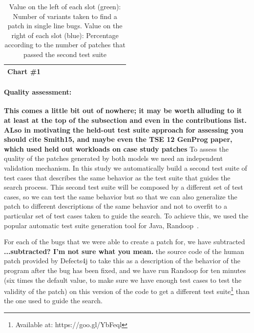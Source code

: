 \documentclass[conference]{IEEEtran}
\newcommand{\ra}[1]{\renewcommand{\arraystretch}{#1}}
\newcommand{\todo}[1]
  {{\scriptsize \textbf{\color{red} {#1}}}}
\begin{document}
\begin{table}
{\begin{tabular}{|r|rr|rr|rr|rr|rr|rr|}
 Chart \#1 & \color{OliveGreen}{1.8}&\color{blue}{0\%} & \color{OliveGreen}{7.3}&\color{blue}{0\%} & \color{OliveGreen}{4.9}&\color{blue}{0\%} & \color{OliveGreen}{19.0}&\color{blue}{0\%} & \color{OliveGreen}{2.2}&\color{blue}{0\%} & \color{OliveGreen}{4.8}&\color{blue}{0\%} \\

\hline
 
\end{tabular}
}
\ra{1.3}
		\caption{Value on the left of each slot (green): Number of variants taken to find a patch in single line bugs. Value on the right of each slot (blue): Percentage according to the number of patches that passed the second test suite}\label{tab:singleLineBugs}
\end{table}


\paragraph{Quality assessment:}\todo{This comes a little bit out of nowhere; it
  may be worth alluding to it at least at the top of the subsection and even in
  the contributions list.  ALso in motivating the held-out test suite approach
  for assessing you should cite Smith15, and maybe even the TSE 12 GenProg
  paper, which used held out workloads on case study patches}
To assess the quality of the patches generated by both models we need an
independent validation mechanism. In this study we automatically build a second
test suite of test cases that describes the same behavior as the test suite that
guides the search process. This second test suite will be composed by a
different set of test cases, so we can test the same behavior but so that we can
also generalize the patch to different descriptions of the same behavior and not
to overfit to a particular set of test cases taken to guide the search. To
achieve this, we used the popular automatic test suite generation tool for Java,
Randoop~\cite{pacheco07}. 

For each of the bugs that we were able to create a patch for, we have
subtracted\todo{...subtracted?  I'm not sure what you mean.}
the source code of the human patch provided by Defects4j to take this as a
description of the behavior of the program after the bug has been fixed, and we
have run Randoop for ten minutes (six times the default value, to make sure we
have enough test cases to test the validity of the patch) on this version of the
code to get a different test suite\footnote{Available at: https://goo.gl/YbFeql}
than the one used to guide the search.  
\end{document}
